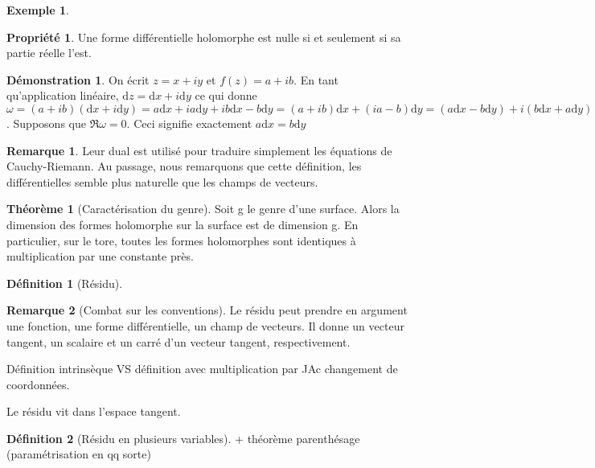 \documentclass{article}
\theoremstyle{definition} %
\newtheorem{defi}{Définition}
\newtheorem{rmq}{Remarque}
\newtheorem{thm}{Théorème}
\newtheorem{ex}{Exemple}
\newtheorem{dem}{Démonstration}
\newtheorem{propri}{Propriété}
\newcommand{\dd}{ \mathrm{d}}
\newcommand{\1}{\mathbb{1}} %
\begin{document}
\begin{ex}

\end{ex}

\begin{propri}
Une forme différentielle holomorphe est nulle si et seulement si sa partie réelle l'est.
\end{propri}

\begin{dem}
On écrit $z=x+iy$ et $f(z)=a+ib$.
En tant qu'application linéaire, $\dd z= \dd x + i \dd y $ ce qui donne $\omega = (a + ib) (\dd x + i \dd y)= a \dd x + i a \dd y + i b \dd x - b \dd y= (a+ib) \dd x + (ia - b) \dd y = (a \dd x - b \dd y) + i(b \dd x + a \dd y)$.
Supposons que $\Re \omega=0$.
Ceci signifie exactement $a \dd x = b \dd y$

\end{dem}

\begin{rmq}
Leur dual est utilisé pour traduire simplement les équations de Cauchy-Riemann.
Au passage, nous remarquons que cette définition, les différentielles semble plus naturelle que les champs de vecteurs.
\end{rmq}

\begin{thm}[Caractérisation du genre]
Soit g le genre d'une surface.
Alors la dimension des formes holomorphe sur la surface est de dimension g.
En particulier, sur le tore, toutes les formes holomorphes sont identiques à multiplication par une constante près.
\end{thm}

\begin{defi}[Résidu]

\end{defi}

\begin{rmq}[Combat sur les conventions]

Le résidu peut prendre en argument une fonction, une forme différentielle, un champ de vecteurs. Il donne un vecteur tangent, un scalaire et un carré d'un vecteur tangent, respectivement.

Définition intrinsèque VS définition avec multiplication par JAc changement de coordonnées.

Le résidu vit dans l'espace tangent.
\end{rmq}

\begin{defi}[Résidu en plusieurs variables]
+ théorème parenthésage (paramétrisation en qq sorte)
\end{defi}
\end{document}
